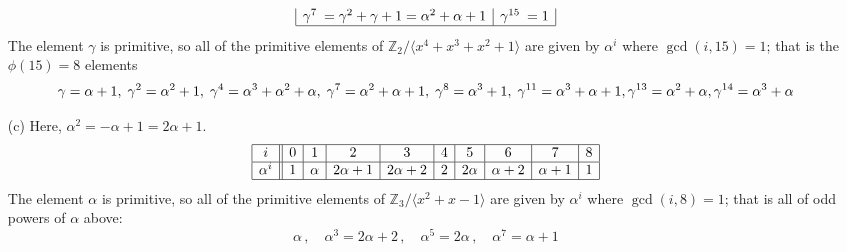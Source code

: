 \documentclass[11pt]{article}
\begin{document}
\begin{itemize}
\[\begin{array}{|ll|ll|}
    \gamma^7 \!\!\!&= \gamma^2 + \gamma + 1 = \alpha^2 + \alpha + 1   & \gamma^{15}\!\!\!&= 1\\\hline
  \end{array}\]
    The element $\gamma$ is primitive, so all of the primitive elements of $\mathbb{Z}_2/\langle x^4+x^3+x^2+1\rangle$
    are given by $\alpha^i$ where $\gcd(i,15) = 1$; that is the $\phi(15) = 8$ elements
    {\small\[
      \gamma   = \alpha + 1,\;
      \gamma^2 = \alpha^2 + 1,\;
      \gamma^4 = \alpha^3 + \alpha^2 + \alpha,\;
      \gamma^7 = \alpha^2 + \alpha + 1,\;
      \gamma^8 = \alpha^3 + 1,\;
      \gamma^{11} = \alpha^3 + \alpha + 1,\;\\
      \gamma^{13} = \alpha^2 + \alpha,\;\\
      \gamma^{14} = \alpha^3 + \alpha
    \]}
  \item[{(c)}] Here, $\alpha^2 = -\alpha + 1 = 2\alpha + 1$.
  \[\begin{array}{|c||c|c|c|c|c|c|c|c|c|}\hline
           i &  0  &    1   &    2      &     3     & 4 &    5    &     6      &     7      & 8 \\\hline
    \alpha^i &  1  & \alpha & 2\alpha+1 & 2\alpha+2 & 2 & 2\alpha & \alpha + 2 & \alpha + 1 & 1 \\\hline
  \end{array}\]
    The element $\alpha$ is primitive, so all of the primitive elements of $\mathbb{Z}_3/\langle x^2+x-1\rangle$
    are given by $\alpha^i$ where $\gcd(i,8) = 1$; that is all of odd powers of $\alpha$ above: 
    \[
      \alpha\,,\quad
      \alpha^3 = 2\alpha + 2\,,\quad
      \alpha^5 = 2\alpha\,,\quad
      \alpha^7 =  \alpha + 1
    \]
\end{itemize}
\end{document}
